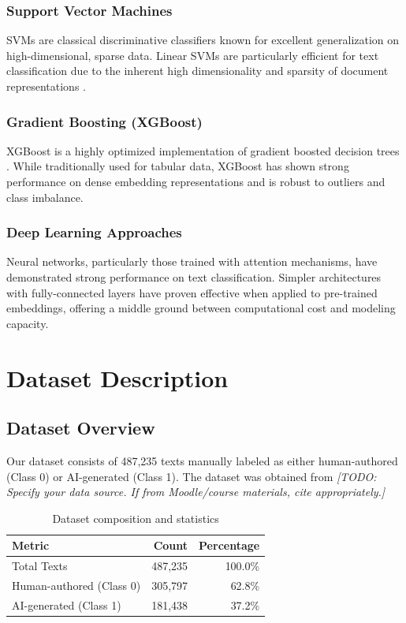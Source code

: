 \documentclass[12pt, a4paper]{article}
\begin{document}
\subsubsection{Support Vector Machines}
SVMs are classical discriminative classifiers known for excellent generalization on high-dimensional, sparse data. Linear SVMs are particularly efficient for text classification due to the inherent high dimensionality and sparsity of document representations \cite{joachims1998text}.

\subsubsection{Gradient Boosting (XGBoost)}
XGBoost is a highly optimized implementation of gradient boosted decision trees \cite{chen2016xgboost}. While traditionally used for tabular data, XGBoost has shown strong performance on dense embedding representations and is robust to outliers and class imbalance.

\subsubsection{Deep Learning Approaches}
Neural networks, particularly those trained with attention mechanisms, have demonstrated strong performance on text classification. Simpler architectures with fully-connected layers have proven effective when applied to pre-trained embeddings, offering a middle ground between computational cost and modeling capacity.

\section{Dataset Description}

\subsection{Dataset Overview}

Our dataset consists of 487,235 texts manually labeled as either human-authored (Class 0) or AI-generated (Class 1). The dataset was obtained from \textit{[TODO: Specify your data source. If from Moodle/course materials, cite appropriately.]}

\begin{table}[H]
\centering
\caption{Dataset composition and statistics}
\begin{tabular}{lrr}
\toprule
\textbf{Metric} & \textbf{Count} & \textbf{Percentage} \\
\midrule
Total Texts & 487,235 & 100.0\% \\
Human-authored (Class 0) & 305,797 & 62.8\% \\
AI-generated (Class 1) & 181,438 & 37.2\% \\
\bottomrule
\end{tabular}
\end{table}
\end{document}
